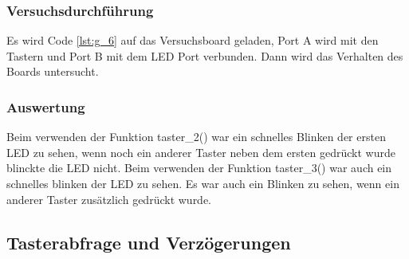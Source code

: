\documentclass[12pt,a4paper]{article}
\begin{document}
\subsubsection*{Versuchsdurchführung}

Es wird Code \ref{lst:g_6} auf das Versuchsboard geladen, Port A wird mit den Tastern und Port B mit dem LED Port verbunden. Dann wird das Verhalten des Boards untersucht.

\subsubsection*{Auswertung}

Beim verwenden der Funktion taster\_2() war ein schnelles Blinken der ersten LED zu sehen, wenn noch ein anderer Taster neben dem ersten gedrückt wurde blinckte die LED nicht. Beim verwenden der Funktion taster\_3() war auch ein schnelles blinken der LED zu sehen. Es war auch ein Blinken zu sehen, wenn ein anderer Taster zusätzlich gedrückt wurde.

\subsection{Tasterabfrage und Verzögerungen}
\end{document}
